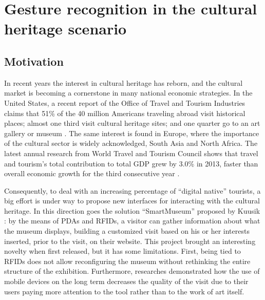 
\chapter{Gesture recognition in the cultural heritage scenario}


\section{Motivation}
In recent years the interest in cultural heritage has reborn, and the cultural market is becoming a cornerstone in many national economic strategies. In the United States, a recent report of the Office of Travel and Tourism Industries claims that 51\% of the 40 million Americans traveling abroad visit historical places; almost one third visit cultural heritage sites; and one quarter go to an art gallery or museum \cite{tourismintelligence}. The same interest is found in Europe, where the importance of the cultural sector is widely acknowledged, South Asia and North Africa. The latest annual research from World Travel and Tourism Council shows that travel and tourism's total contribution to total GDP grew by 3.0\% in 2013, faster than overall economic growth for the third consecutive year \cite{econotravel}.

Consequently, to deal with an increasing percentage of ``digital native'' tourists, a big effort is under way to propose new interfaces for interacting with the cultural heritage.
 In this direction goes the solution ``SmartMuseum'' proposed by Kuusik \etal \cite{kuusik2009smartmuseum}: by the means of PDAs and RFIDs, a visitor can gather information about what the museum displays, building a customized visit based on his or her interests inserted, prior to the visit, on their website. This project brought an interesting novelty when first released, but it has some limitations. First, being tied to RFIDs does not allow reconfiguring the museum without rethinking the entire structure of the exhibition. Furthermore, researches demonstrated how the use of mobile devices on the long term decreases the quality of the visit due to their users paying more attention to the tool rather than to the work of art itself.

